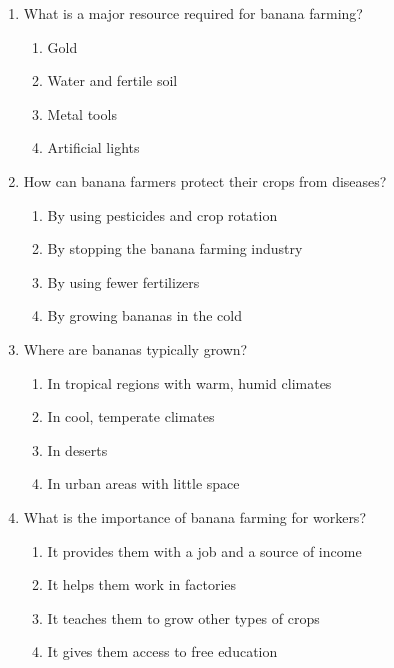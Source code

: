 \documentclass[12pt]{article}
\begin{document}
\begin{enumerate}
    \vspace{0.5cm}

    \item What is a major resource required for banana farming?

    \begin{enumerate}[label=\Alph*.]
        \item Gold
        \item Water and fertile soil
        \item Metal tools
        \item Artificial lights
    \end{enumerate}
    
    \vspace{0.5cm}

    \item How can banana farmers protect their crops from diseases?

    \begin{enumerate}[label=\Alph*.]
        \item By using pesticides and crop rotation
        \item By stopping the banana farming industry
        \item By using fewer fertilizers
        \item By growing bananas in the cold
    \end{enumerate}
    
    \vspace{0.5cm}

    \item Where are bananas typically grown?

    \begin{enumerate}[label=\Alph*.]
        \item In tropical regions with warm, humid climates
        \item In cool, temperate climates
        \item In deserts
        \item In urban areas with little space
    \end{enumerate}
    
    \vspace{0.5cm}

    \item What is the importance of banana farming for workers?

    \begin{enumerate}[label=\Alph*.]
        \item It provides them with a job and a source of income
        \item It helps them work in factories
        \item It teaches them to grow other types of crops
        \item It gives them access to free education
    \end{enumerate}
    

\end{enumerate}
\end{document}
